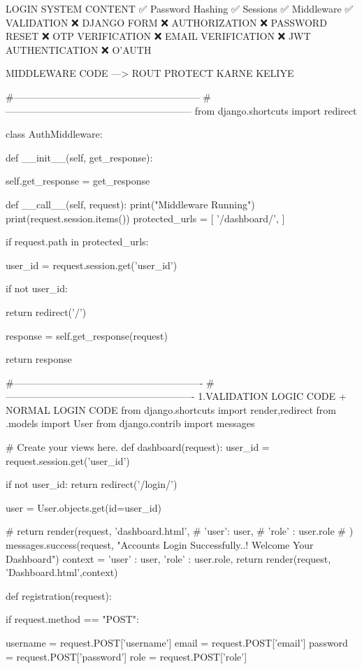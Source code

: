 LOGIN SYSTEM CONTENT
✅ Password Hashing
✅ Sessions
✅ Middleware
✅ VALIDATION
❌ DJANGO FORM
❌ AUTHORIZATION
❌ PASSWORD RESET
❌ OTP VERIFICATION
❌ EMAIL VERIFICATION
❌ JWT AUTHENTICATION
❌ O'AUTH


MIDDLEWARE CODE ---> ROUT PROTECT KARNE KELIYE

#---------------------------------------------------------
#---------------------------------------------------------
from django.shortcuts import redirect

class AuthMiddleware:

    def __init__(self, get_response):

        self.get_response = get_response

    def __call__(self, request):
        print("Middleware Running")
        print(request.session.items())
        protected_urls = [
            '/dashboard/',
        ]

        if request.path in protected_urls:

            user_id = request.session.get('user_id')

            if not user_id:

                return redirect('/')

        response = self.get_response(request)

        return response

        
#----------------------------------------------------------
#----------------------------------------------------------
1.VALIDATION LOGIC CODE + NORMAL LOGIN CODE
from django.shortcuts import render,redirect
from .models import User
from django.contrib import messages


# Create your views here.
def dashboard(request):
    user_id = request.session.get('user_id')

    if not user_id:
        return redirect('/login/')

    user = User.objects.get(id=user_id)

    # return render(request, 'dashboard.html', {
    #     'user': user,
    #     'role' : user.role
    # })
    messages.success(request, "Accounts Login Successfully..! Welcome Your Dashboard")
    context = {
        'user' : user,
        'role' : user.role,
    }
    return render(request, 'Dashboard.html',context)


def registration(request):
    
    if request.method == "POST":
    
        username = request.POST['username']
        email = request.POST['email']
        password = request.POST['password']
        role = request.POST['role']

